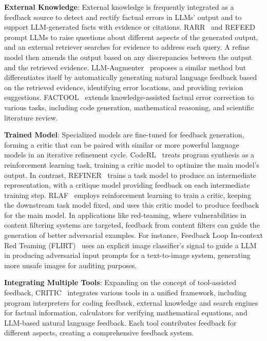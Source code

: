 \documentclass[a4paper,oneside]{book}
\begin{document}
\textbf{External Knowledge}: External knowledge is frequently integrated as a feedback source to detect and rectify factual errors in LLMs' output and to support LLM-generated facts with evidence or citations. RARR~\cite{gao2023rarr} and REFEED~\cite{yu2023improving} prompt LLMs to raise questions about different aspects of the generated output, and an external retriever searches for evidence to address each query. A refine model then amends the output based on any discrepancies between the output and the retrieved evidence. LLM-Augmenter~\cite{peng2023check} proposes a similar method but differentiates itself by automatically generating natural language feedback based on the retrieved evidence, identifying error locations, and providing revision suggestions. FACTOOL~\cite{chern2023factool} extends knowledge-assisted factual error correction to various tasks, including code generation, mathematical reasoning, and scientific literature review.

\textbf{Trained Model}: Specialized models are fine-tuned for feedback generation, forming a critic that can be paired with similar or more powerful language models in an iterative refinement cycle. CodeRL~\cite{le2022coderl} treats program synthesis as a reinforcement learning task, training a critic model to optimize the main model's output. In contrast, REFINER~\cite{paul2023refiner} trains a task model to produce an intermediate representation, with a critique model providing feedback on each intermediate training step. RLAF~\cite{akyurek2023rl4f} employs reinforcement learning to train a critic, keeping the downstream task model fixed, and uses this critic model to produce feedback for the main model. In applications like red-teaming, where vulnerabilities in content filtering systems are targeted, feedback from content filters can guide the generation of better adversarial examples. For instance, Feedback Loop In-context Red Teaming (FLIRT)~\cite{mehrabi2023flirt} uses an explicit image classifier's signal to guide a LLM in producing adversarial input prompts for a text-to-image system, generating more unsafe images for auditing purposes.

\textbf{Integrating Multiple Tools}: Expanding on the concept of tool-assisted feedback, CRITIC~\cite{gou2023critic} integrates various tools in a unified framework, including program interpreters for coding feedback, external knowledge and search engines for factual information, calculators for verifying mathematical equations, and LLM-based natural language feedback. Each tool contributes feedback for different aspects, creating a comprehensive feedback system.
\end{document}
